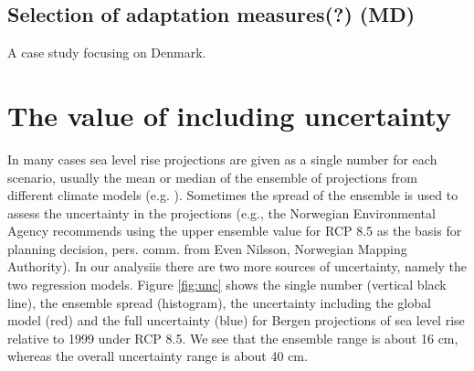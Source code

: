 \documentclass[draft,linenumbers]{agujournal}
\begin{document}
\subsection{Selection of adaptation measures(?) {\color{blue} (MD)}}

A case study focusing on Denmark. 

\section{The value of including uncertainty}
\label{unc}

In many cases sea level rise projections are given as a single number for each scenario, usually the mean or median of the ensemble of projections from different climate models (e.g. \citet{climateimpactgroup}). Sometimes the spread of the ensemble is used to assess the uncertainty in the projections (e.g., the Norwegian Environmental Agency recommends using the upper ensemble value for RCP 8.5 as the basis for planning decision, pers. comm. from Even Nilsson, Norwegian Mapping Authority). In our analysiis there are two more sources of uncertainty, namely the two regression models. Figure \ref{fig:unc} shows the single number (vertical black line), the ensemble spread (histogram), the uncertainty including the global model (red) and the full uncertainty (blue) for Bergen projections of sea level rise relative to 1999 under RCP 8.5. We see that the ensemble range is about 16 cm, whereas the overall uncertainty range is about 40 cm.
\end{document}

